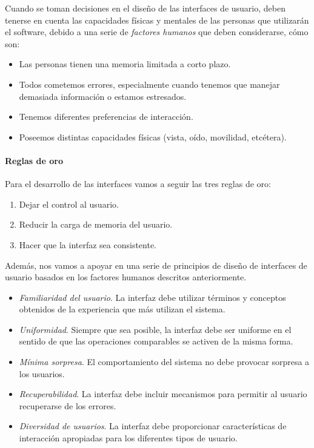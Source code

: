 \documentclass[a4paper,oneside,11pt]{book}
\begin{document}
	Cuando se toman decisiones en el diseño de las interfaces de usuario, deben tenerse en cuenta las capacidades físicas y mentales de las personas que utilizarán el software, debido a una serie de \textit{factores humanos} que deben considerarse, cómo son:
	\begin{itemize}
		\item Las personas tienen una memoria limitada a corto plazo.
		\item Todos cometemos errores, especialmente cuando tenemos que manejar demasiada información o estamos estresados.
		\item Tenemos diferentes preferencias de interacción.
		\item Poseemos distintas capacidades físicas (vista, oído, movilidad, etcétera).
	\end{itemize}
	\paragraph{Reglas de oro} %
	\label{par:reglas_de_oro}
	
	Para el desarrollo de las interfaces vamos a seguir las tres reglas de oro:
	\begin{enumerate}
		\item Dejar el control al usuario.
		\item Reducir la carga de memoria del usuario.
		\item Hacer que la interfaz sea consistente.
	\end{enumerate}
	
	Además, nos vamos a apoyar en una serie de principios de diseño de interfaces de usuario basados en los factores humanos descritos anteriormente. 
	\begin{itemize}
		\item \textit{Familiaridad del usuario}. La interfaz debe utilizar términos y conceptos obtenidos de la experiencia que más utilizan el sistema.
		\item \textit{Uniformidad}. Siempre que sea posible, la interfaz debe ser uniforme en el sentido de que las operaciones comparables se activen de la misma forma.
		\item \textit{Mínima sorpresa}. El comportamiento del sistema no debe provocar sorpresa a los usuarios.
		\item \textit{Recuperabilidad}. La interfaz debe incluir mecanismos para permitir al usuario recuperarse de los errores.
		\item \textit{Diversidad de usuarios}. La interfaz debe proporcionar características de interacción apropiadas para los diferentes tipos de usuario.
	\end{itemize}
	
\end{document}
